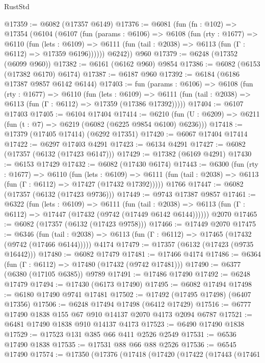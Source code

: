 \begin{lexlean}{RustStd}
\begin{coremodule}
@17359 := @6082 (@17357 @6149)
@17376 := @6081
    (fun (fn : @102) =>
    @17354
      (@6104
        (@6107
          (fun (params : @6106) =>
          @6108
            (fun (rty : @1677) =>
            @6110
              (fun (lets : @6109) =>
              @6111 (fun (tail : @2038) => @6113 (fun (Γ : @6112) => @17359 @6196))))))
        @6242))
    @960
@17379 := @6248 (@17352 (@6099 @960))
@17382 := @6161 (@6162 @960) @9854
@17386 := @6082 (@6153 (@17382 @6170) @6174)
@17387 := @6187 @960
@17392 := @6184 (@6186 @17387 @9857 @6142 @6144)
@17403 := fun (params : @6106) =>
  @6108
    (fun (rty : @1677) =>
    @6110
      (fun (lets : @6109) =>
      @6111 (fun (tail : @2038) => @6113 (fun (Γ : @6112) => @17359 (@17386 @17392)))))
@17404 := @6107 @17403
@17405 := @6104 @17404
@17414 := @6210 (fun (U : @6209) => @6211 (fun (t : @7) => @6219 (@6082 (@6225 @9854 @6100) @6236)))
@17418 := @17379 (@17405 @17414) (@6292 @17351)
@17420 := @6067 @17404 @17414
@17422 := @6297 @17403 @4291
@17423 := @6134 @4291
@17427 := @6082 (@17357 (@6132 (@17423 @6147)))
@17429 := @17382 (@6169 @4291)
@17430 := @6153 @17429
@17432 := @6082 (@17430 @6174)
@17443 := @6300
    (fun (rty : @1677) =>
    @6110
      (fun (lets : @6109) =>
      @6111 (fun (tail : @2038) => @6113 (fun (Γ : @6112) => @17427 (@17432 @17392)))))
    @1766
@17447 := @6082 (@17357 (@6132 (@17423 @9736)))
@17449 := @9743 @17387 @9857
@17461 := @6322
    (fun (lets : @6109) =>
    @6111
      (fun (tail : @2038) =>
      @6113 (fun (Γ : @6112) => @17447 (@17432 (@9742 (@17449 @6142 @6144))))))
    @2070
@17465 := @6082 (@17357 (@6132 (@17423 @9758)))
@17466 := @17449 @2070
@17475 := @6346
    (fun (tail : @2038) => @6113 (fun (Γ : @6112) => @17465 (@17432 (@9742 (@17466 @6144)))))
    @4174
@17479 := @17357 (@6132 (@17423 (@9735 @16442)))
@17480 := @6082 @17479
@17481 := @17466 @4174
@17486 := @6364 (fun (Γ : @6112) => @17480 (@17432 (@9742 @17481)))
@17490 := @6377 (@6380 (@17105 @6385)) @9789
@17491 := @17486 @17490
@17492 := @6248 @17479
@17494 := @17430 (@6173 @17490)
@17495 := @6082 @17494
@17498 := @6180 @17490 @9741 @17481
@17502 := @17492 (@17495 @17498) (@6407 @17356)
@17506 := @6248 @17494 @17498 (@6412 @17429)
@17516 := @6777 @17490 @1838 @155 @67 @910 @14137 @2070 @4173 @2094 @6787
@17521 := @6481 @17490 @1838 @910 @14137 @4173
@17523 := @6490 @17490 @1838
@17529 := @17523 @131 @385 @66 @411 @2526 @2549
@17531 := @6536 @17490 @1838
@17535 := @17531 @88 @66 @88 @2526
@17536 := @6545 @17490
@17574 := @17350
    (@17376
      (@17418
        (@17420
          (@17422
            (@17443
              (@17461

\end{coremodule}
\end{lexlean}
